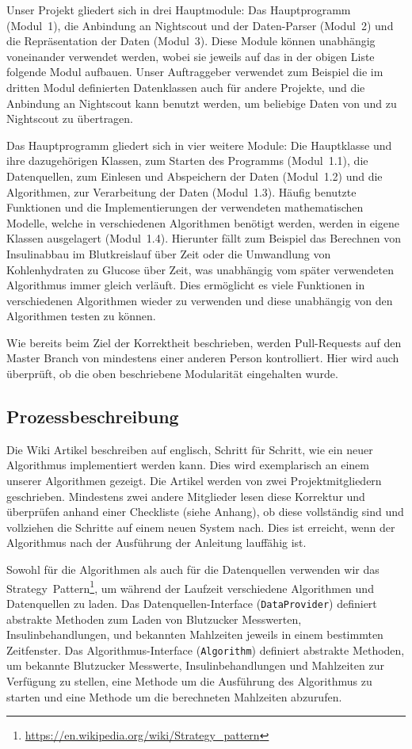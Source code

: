 \documentclass[accentcolor=tud0b,12pt,paper=a4]{tudreport}
\begin{document}
Unser Projekt gliedert sich in drei Hauptmodule: Das Hauptprogramm \mbox{(Modul 1)}, die Anbindung an Nightscout und der Daten-Parser \mbox{(Modul 2)} und die Repräsentation der Daten \mbox{(Modul 3)}. Diese Module können unabhängig voneinander verwendet werden, wobei sie jeweils auf das in der obigen Liste folgende Modul aufbauen. Unser Auftraggeber verwendet zum Beispiel die im dritten Modul definierten Datenklassen auch für andere Projekte, und die Anbindung an Nightscout kann benutzt werden, um beliebige Daten von und zu Nightscout zu übertragen.

Das Hauptprogramm gliedert sich in vier weitere Module: Die Hauptklasse und ihre dazugehörigen Klassen, zum Starten des Programms \mbox{(Modul 1.1)}, die Datenquellen, zum Einlesen und Abspeichern der Daten \mbox{(Modul 1.2)} und die Algorithmen, zur Verarbeitung der Daten \mbox{(Modul 1.3)}. Häufig benutzte Funktionen und die Implementierungen der verwendeten mathematischen Modelle, welche in verschiedenen Algorithmen benötigt werden, werden in eigene Klassen ausgelagert \mbox{(Modul 1.4)}. Hierunter fällt zum Beispiel das Berechnen von Insulinabbau im Blutkreislauf über Zeit oder die Umwandlung von Kohlenhydraten zu Glucose über Zeit, was unabhängig vom später verwendeten Algorithmus immer gleich verläuft. Dies ermöglicht es viele Funktionen in verschiedenen Algorithmen wieder zu verwenden und diese unabhängig von den Algorithmen testen zu können.

Wie bereits beim Ziel der Korrektheit beschrieben, werden Pull-Requests auf den Master Branch von mindestens einer anderen Person kontrolliert. Hier wird auch überprüft, ob die oben beschriebene Modularität eingehalten wurde.

\subsection{Prozessbeschreibung}

Die Wiki Artikel beschreiben auf englisch, Schritt für Schritt, wie ein neuer Algorithmus implementiert werden kann. Dies wird exemplarisch an einem unserer Algorithmen gezeigt. Die Artikel werden von zwei Projektmitgliedern geschrieben. Mindestens zwei andere Mitglieder lesen diese Korrektur und überprüfen anhand einer Checkliste (siehe Anhang), ob diese vollständig sind und vollziehen die Schritte auf einem neuen System nach. Dies ist erreicht, wenn der Algorithmus nach der Ausführung der Anleitung lauffähig ist.

Sowohl für die Algorithmen als auch für die Datenquellen verwenden wir das \mbox{Strategy Pattern}\footnote{\url{https://en.wikipedia.org/wiki/Strategy_pattern}}, um während der Laufzeit verschiedene Algorithmen und Datenquellen zu laden. Das Datenquellen-Interface \mbox{(\texttt{DataProvider})} definiert abstrakte Methoden zum Laden von Blutzucker Messwerten, Insulinbehandlungen, und bekannten Mahlzeiten jeweils in einem bestimmten Zeitfenster. Das Algorithmus-Interface \mbox{(\texttt{Algorithm})} definiert abstrakte Methoden, um bekannte Blutzucker Messwerte, Insulinbehandlungen und Mahlzeiten zur Verfügung zu stellen, eine Methode um die Ausführung des Algorithmus zu starten und eine Methode um die berechneten Mahlzeiten abzurufen.
\end{document}
